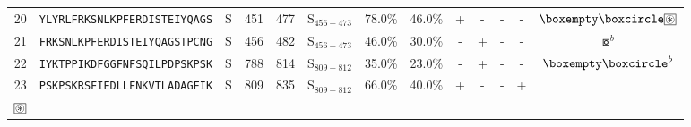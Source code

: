 \begin{tabular}{rcccccccccccc}
20 &  \texttt{YLYRLFRKSNLKPFERDISTEIYQAGS} &       S &    451 &   477 &  S$_{456-473}$ &                          78.0\% &                           46.0\% &          + &           - &          - &           - &                                                                 $ \boxempty \boxcircle \setlength{\fboxsep}{0.5pt} \boxed{\circledast} $ \\
21 &  \texttt{FRKSNLKPFERDISTEIYQAGSTPCNG} &       S &    456 &   482 &  S$_{456-473}$ &                          46.0\% &                           30.0\% &          - &           + &          - &           - &                                                                                                                         $ \boxcircle^b $ \\
22 &  \texttt{IYKTPPIKDFGGFNFSQILPDPSKPSK} &       S &    788 &   814 &  S$_{809-812}$ &                          35.0\% &                           23.0\% &          - &           + &          - &           - &                                                                                                               $ \boxempty \boxcircle^b $ \\
23 &  \texttt{PSKPSKRSFIEDLLFNKVTLADAGFIK} &       S &    809 &   835 &  S$_{809-812}$ &                          66.0\% &                           40.0\% &          + &           - &          - &           + &                       \Centerstack{  $\boxast \boxast^b \boxcircle \boxcircle^d$ \\  $\setlength{\fboxsep}{0.5pt} \boxed{\circledast}$ } \\
\bottomrule
\end{tabular}

